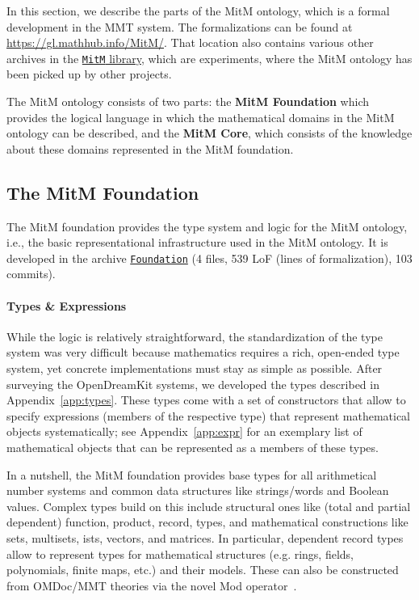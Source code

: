 \newcommand{\fold}[2]{\let\@tmpop=\relax\@for\@I:=#2\do{\@tmpop\@I\let\@tmpop=#1}}
\newcommand{\record}[1]{\{\fold{,}{#1}\}}
\newcommand{\union}[1]{[\fold{,}{#1}]}
\newcommand{\sq}{\subseteq}

In this section, we describe the parts of the MitM ontology, which is a formal development in the MMT system.
The formalizations can be found at \url{https://gl.mathhub.info/MitM/}.
That location also contains various other archives in the \href{https://gl.mathhub.info/MitM/}{\texttt{MitM} library}, which are experiments, where the MitM ontology has been picked up by other projects.

The MitM ontology consists of two parts: the \textbf{MitM Foundation} which provides the logical language in which the mathematical domains in the MitM ontology can be described, and the \textbf{MitM Core}, which consists of the knowledge about these domains represented in the MitM foundation.

\subsection{The MitM Foundation}\label{sec:foundation}

The MitM foundation provides the type system and logic for the MitM ontology, i.e., the basic representational infrastructure used in the MitM ontology.
It is developed in the archive  \href{https://gl.mathhub.info/MitM/Foundation}{\texttt{Foundation}} (4 files, 539 LoF (lines
of formalization), 103 commits).

\paragraph{Types \& Expressions}
While the logic is relatively straightforward, the standardization of the type system was very difficult because mathematics requires a rich, open-ended type system, yet concrete implementations must stay as simple as possible.
After surveying the OpenDreamKit systems, we developed the types described in Appendix~\ref{app:types}.
These types come with a set of constructors that allow to specify expressions (members of the respective type) that represent mathematical objects systematically; see Appendix~\ref{app:expr} for an exemplary list of mathematical objects that can be represented as a members of these types.

In a nutshell, the MitM foundation provides base types for all arithmetical number systems and common data structures like strings/words and Boolean values.
Complex types build on this include structural ones like (total and partial dependent) function, product, record, types, and mathematical constructions like sets, multisets, ists, vectors, and matrices.
In particular, dependent record types allow to represent types for mathematical structures (e.g. rings, fields, polynomials, finite maps, etc.) and their models.
These can also be constructed from OMDoc/MMT theories via the novel \textsf{Mod} operator~\cite{MueRabKoh:tat18}.

